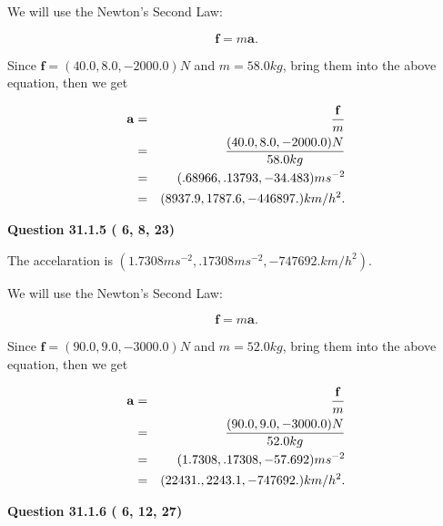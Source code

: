\documentclass[12pt]{article}
\begin{document}
We will use the Newton's Second Law:
 
\[
\mathbf{f}=m\mathbf{a}.
\]
 
Since $\mathbf{f}=( %
40.0,  %
8.0,  %
-2000.0 )N$
and $m= %
58.0 kg$, bring them into the above equation, then we get
 
\begin{eqnarray*}
\mathbf{a}&=&\frac{\mathbf{f}}m  \\
&=&\frac{(
40.0 ,
8.0 ,
-2000.0 )N
}{ %
58.0 kg}  \\
&=&(
.68966 ,
.13793,
-34.483
)ms^{-2} \\
&=&(
8937.9 ,
1787.6 ,
-446897.
)km/h^2.
\end{eqnarray*}
 
 
 
  
\vspace{0.2in}
  
{\textbf{\Large{Question
31.1.5 
 (          6,          8,         23)
}}}
  
  
 
 
\noindent{}
 
 
The accelaration is
$(
1.7308ms^{-2},
.17308ms^{-2},
-747692.km/h^2
).
$
 
 
 
 
 
 
\noindent{}

We will use the Newton's Second Law:
 
\[
\mathbf{f}=m\mathbf{a}.
\]
 
Since $\mathbf{f}=( %
90.0,  %
9.0,  %
-3000.0 )N$
and $m= %
52.0kg$, bring them into the above equation, then we get
 
\begin{eqnarray*}
\mathbf{a}&=&\frac{\mathbf{f}}m  \\
&=&\frac{(
90.0 ,
9.0 ,
-3000.0 )N
}{ %
52.0 kg}  \\
&=&(
1.7308 ,
.17308,
-57.692
)ms^{-2} \\
&=&(
22431. ,
2243.1 ,
-747692.
)km/h^2.
\end{eqnarray*}
 
 
 
  
\vspace{0.2in}
  
{\textbf{\Large{Question
31.1.6 
 (          6,         12,         27)
}}}
  
\end{document}
